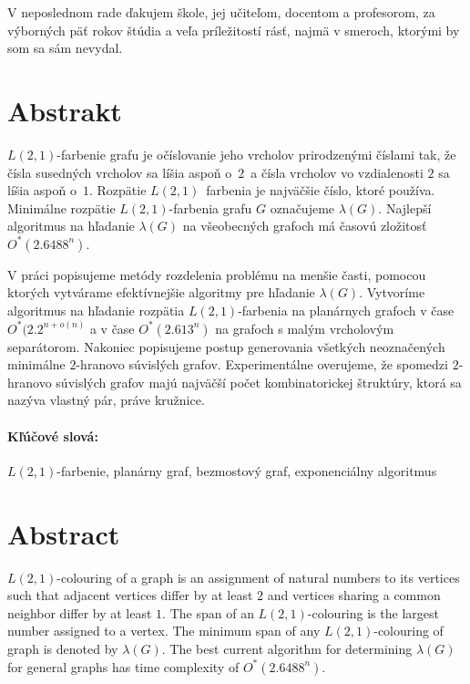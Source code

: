 \documentclass[12pt, oneside]{book}
\begin{document}
V neposlednom rade ďakujem škole, jej učiteľom, docentom a profesorom, za výborných päť
rokov štúdia a veľa príležitostí rásť, najmä v smeroch, ktorými by som sa sám nevydal.


\newpage 
\section*{Abstrakt}

$L(2,1)$-farbenie grafu je očíslovanie jeho vrcholov prirodzenými číslami tak,
že čísla susedných vrcholov sa líšia aspoň o $2$ a čísla vrcholov vo vzdialenosti
$2$ sa líšia aspoň o $1$. Rozpätie $L(2,1)$ farbenia je najväčšie číslo, ktoré
používa. Minimálne rozpätie $L(2,1)$-farbenia grafu $G$ označujeme $\lambda(G)$.
Najlepší algoritmus na hľadanie $\lambda(G)$ na všeobecných grafoch má
časovú zložitosť $O^*(2.6488^n)$.

V práci popisujeme metódy rozdelenia problému na menšie časti, pomocou
ktorých vytvárame efektívnejšie algoritmy pre hľadanie $\lambda(G)$.
Vytvoríme algoritmus na hľadanie rozpätia $L(2,1)$-farbenia na planárnych
grafoch v čase $O^*(2.2^{n + o(n)}$ a v čase $O^*(2.613^n)$ na grafoch s malým
vrcholovým separátorom. Nakoniec popisujeme postup generovania všetkých neoznačených
minimálne $2$-hranovo súvislých grafov. Experimentálne overujeme, že spomedzi $2$-hranovo
súvislých grafov majú najväčší počet kombinatorickej štruktúry, ktorá sa
nazýva vlastný pár, práve kružnice.

\paragraph*{Kľúčové slová:} $L(2,1)$-farbenie, planárny graf, bezmostový graf, exponenciálny algoritmus



\newpage 
\section*{Abstract}

$L(2,1)$-colouring of a graph is an assignment of natural numbers to its vertices such
that adjacent vertices differ by at least $2$ and vertices sharing a common neighbor
differ by at least $1$. The span of an $L(2,1)$-colouring is the largest number assigned
to a vertex. The minimum span of any $L(2,1)$-colouring of graph is denoted by $\lambda(G)$.
The best current algorithm for determining $\lambda(G)$ for general graphs has
time complexity of $O^*(2.6488^n)$.
\end{document}
